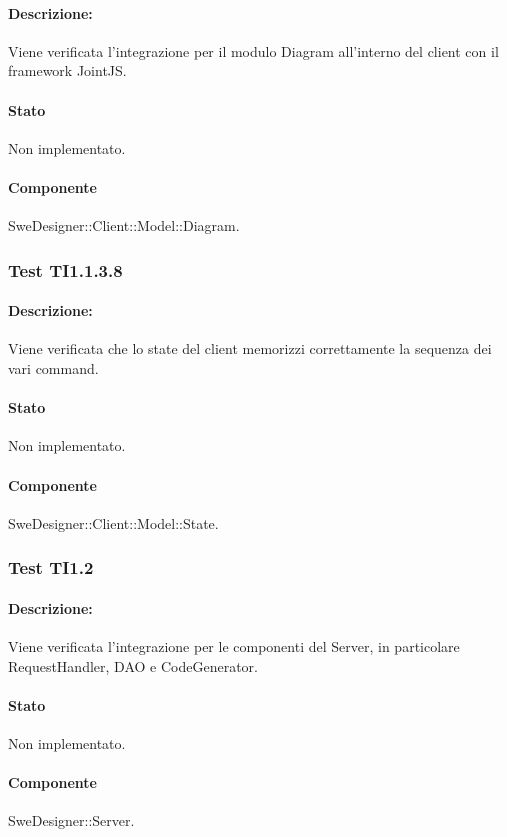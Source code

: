 \documentclass[../PianoDiQualifica.tex]{subfiles}
\begin{document}
	\paragraph{Descrizione:} Viene verificata l'integrazione per il modulo Diagram all'interno del client con il framework JointJS. 
	\paragraph{Stato} Non implementato.
	\paragraph{Componente} SweDesigner::Client::Model::Diagram.
	\subsubsection{Test TI1.1.3.8}
	\paragraph{Descrizione:} Viene verificata che lo state del client memorizzi correttamente la sequenza dei vari command. 
	\paragraph{Stato} Non implementato.
	\paragraph{Componente} SweDesigner::Client::Model::State.
	
	
	
	
	\subsubsection{Test TI1.2}
	\paragraph{Descrizione:} Viene verificata l'integrazione per le componenti del Server, in particolare RequestHandler, DAO e CodeGenerator.
	\paragraph{Stato} Non implementato.
	\paragraph{Componente} SweDesigner::Server.
	
\end{document}
